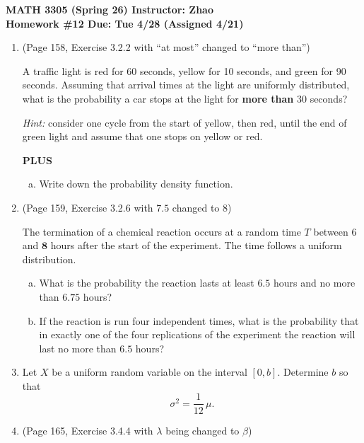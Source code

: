 \documentclass[12pt]{article}
\begin{document}
\begin{center}
  \textbf{\large MATH 3305 (Spring 26) \hfill Instructor: Zhao}\\[4pt]
  \textbf{\large Homework \#12 \hfill Due: Tue 4/28 (Assigned 4/21)}
\end{center}

\bigskip

\begin{enumerate}
  \item (Page 158, Exercise 3.2.2 with ``at most'' changed to ``more than'')

    A traffic light is red for 60 seconds, yellow for 10 seconds, and green for 90 seconds. Assuming that arrival times at the light are uniformly distributed, what is the probability a car stops at the light for \textbf{more than} 30 seconds?

    \textit{Hint:} consider one cycle from the start of yellow, then red, until the end of green light and assume that one stops on yellow or red.

    \textbf{PLUS}
    \begin{enumerate}[(b)]
      \item Write down the probability density function.
    \end{enumerate}

  \newpage
  \item (Page 159, Exercise 3.2.6 with $7.5$ changed to $8$)

    The termination of a chemical reaction occurs at a random time $T$ between $6$ and $\mathbf{8}$ hours after the start of the experiment. The time follows a uniform distribution.
    \begin{enumerate}[(a)]
      \item What is the probability the reaction lasts at least $6.5$ hours and no more than $6.75$ hours?
      \item If the reaction is run four independent times, what is the probability that in exactly one of the four replications of the experiment the reaction will last no more than $6.5$ hours?
    \end{enumerate}

  \newpage
  \item Let $X$ be a uniform random variable on the interval $[0, b]$. Determine $b$ so that
    \[
      \sigma^2 = \frac{1}{12}\,\mu.
    \]

  \newpage
  \item (Page 165, Exercise 3.4.4 with $\lambda$ being changed to $\beta$)


\end{enumerate}
\end{document}
